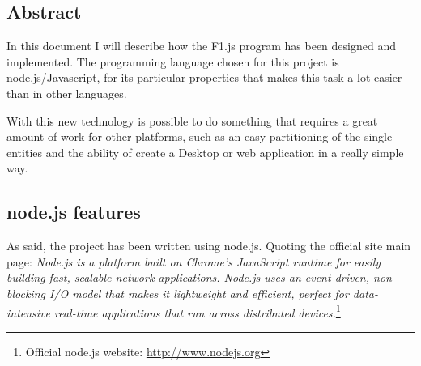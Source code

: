 
\def\PROJECT		{F1.js} %
\def\SUBTITLE		{subtitle}

\def\AUTHOR			{\ME}

\def\TABLES		{false} %
\def\FIGURES	{true} %



\newpage
\thispagestyle{empty}
\mbox{}
\newpage

\newpage


\newpage
\thispagestyle{empty}
\mbox{}
\newpage

\hspace{1cm}
\begin{center}
\section*{Abstract}
\end{center}
In this document I will describe how the F1.js program has been designed and implemented. The programming language chosen for this project is node.js/Javascript, for its particular properties that makes this task a lot easier than in other languages.

With this new technology is possible to do something that requires a great amount of work for other platforms, such as an easy partitioning of the single entities and the ability of create a Desktop or web application in a really simple way.

\newpage
\thispagestyle{empty}
\mbox{}
\newpage

\subsection{node.js features}

As said, the project has been written using node.js. Quoting the official site main page: \textit{Node.js is a platform built on Chrome's JavaScript runtime for easily building fast, scalable network applications. Node.js uses an event-driven, non-blocking I/O model that makes it lightweight and efficient, perfect for data-intensive real-time applications that run across distributed devices.}\footnote{ Official node.js website: \url{http://www.nodejs.org}}


